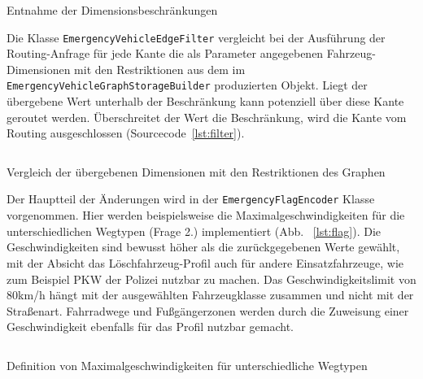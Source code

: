 \begin{listing}[htb]
\centering
{}
\inputminted[gobble=6, fontsize=\footnotesize, breaklines=true, breakbytoken=|, firstline=161, lastline=180]{java}{../data/JavaFiles/EmergencyVehicleGraphStorageBuilder.java}
\caption{Entnahme der Dimensionsbeschränkungen}
\label{lst:builder}
\end{listing}

Die Klasse \texttt{EmergencyVehicleEdgeFilter} vergleicht bei der Ausführung der Routing-Anfrage für jede Kante die als Parameter angegebenen Fahrzeug-Dimensionen mit den Restriktionen aus dem im \texttt{EmergencyVehicleGraphStorageBuilder} produzierten Objekt.
Liegt der übergebene Wert unterhalb der Beschränkung kann potenziell über diese Kante geroutet werden.
Überschreitet der Wert die Beschränkung, wird die Kante vom Routing ausgeschlossen (Sourcecode~\ref{lst:filter}).

\begin{listing}[htb]
\centering
{}
\inputminted[gobble=5, fontsize=\footnotesize, breaklines=true, breakbytoken=|, firstline=102, lastline=107]{java}{../data/JavaFiles/EmergencyVehicleEdgeFilter.java}
\caption{Vergleich der übergebenen Dimensionen mit den Restriktionen des Graphen}
\label{lst:filter}
\end{listing}

Der Hauptteil der Änderungen wird in der \texttt{EmergencyFlagEncoder} Klasse vorgenommen.
Hier werden beispielsweise die Maximalgeschwindigkeiten für die unterschiedlichen Wegtypen (Frage 2.) implementiert (Abb. ~\ref{lst:flag}).
Die Geschwindigkeiten sind bewusst höher als die zurückgegebenen Werte gewählt, mit der Absicht das Löschfahrzeug-Profil auch für andere Einsatzfahrzeuge, wie zum Beispiel PKW der Polizei nutzbar zu machen.
Das Geschwindigkeitslimit von 80km/h hängt mit der ausgewählten Fahrzeugklasse zusammen und nicht mit der Straßenart.
Fahrradwege und Fußgängerzonen werden durch die Zuweisung einer Geschwindigkeit ebenfalls für das Profil nutzbar gemacht.

\begin{listing}[htb]
\centering
{}
\inputminted[gobble=2, fontsize=\footnotesize, breaklines, breakbytoken=|, firstline=169, lastline=199]{java}{../data/JavaFiles/EmergencyFlagEncoder.java}
\caption{Definition von Maximalgeschwindigkeiten für unterschiedliche Wegtypen}
\label{lst:flag}
\end{listing}

